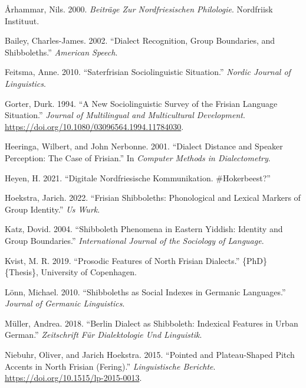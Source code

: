\documentclass[
  letterpaper,
  DIV=11,
  numbers=noendperiod]{scrartcl}
\newlength{\cslhangindent}
\newenvironment{CSLReferences}[2] %
 {\begin{list}{}{%
  \setlength{\itemindent}{0pt}
  \setlength{\leftmargin}{0pt}
  \setlength{\parsep}{0pt}
  \ifodd #1
   \setlength{\leftmargin}{\cslhangindent}
   \setlength{\itemindent}{-1\cslhangindent}
  \fi
  \setlength{\itemsep}{#2\baselineskip}}}
 {\end{list}}
\begin{document}
\label{refs}
\begin{CSLReferences}{1}{0}
Århammar, Nils. 2000. \emph{Beiträge Zur Nordfriesischen {Philologie}}.
Nordfriisk Instituut.

Bailey, Charles-James. 2002. {``Dialect {Recognition}, {Group}
{Boundaries}, and {Shibboleths}.''} \emph{American Speech}.

Feitsma, Anne. 2010. {``Saterfrisian Sociolinguistic Situation.''}
\emph{Nordic Journal of Linguistics}.

Gorter, Durk. 1994. {``A New Sociolinguistic Survey of the {Frisian}
Language Situation.''} \emph{Journal of Multilingual and Multicultural
Development}. \url{https://doi.org/10.1080/03096564.1994.11784030}.

Heeringa, Wilbert, and John Nerbonne. 2001. {``Dialect Distance and
Speaker Perception: {The} Case of {Frisian}.''} In \emph{Computer
{Methods} in {Dialectometry}}.

Heyen, H. 2021. {``Digitale Nordfriesische {Kommunikation}.
\#Hokerbeest?''}

Hoekstra, Jarich. 2022. {``Frisian {Shibboleths}: {Phonological} and
{Lexical} {Markers} of {Group} {Identity}.''} \emph{Us Wurk}.

Katz, Dovid. 2004. {``Shibboleth {Phenomena} in {Eastern} {Yiddish}:
{Identity} and {Group} {Boundaries}.''} \emph{International Journal of
the Sociology of Language}.

Kvist, M. R. 2019. {``Prosodic {Features} of {North} {Frisian}
{Dialects}.''} \{PhD\} \{Thesis\}, University of Copenhagen.

Lönn, Michael. 2010. {``Shibboleths as {Social} {Indexes} in {Germanic}
{Languages}.''} \emph{Journal of Germanic Linguistics}.

Müller, Andrea. 2018. {``Berlin {Dialect} as {Shibboleth}: {Indexical}
{Features} in {Urban} {German}.''} \emph{Zeitschrift Für Dialektologie
Und Linguistik}.

Niebuhr, Oliver, and Jarich Hoekstra. 2015. {``Pointed and
Plateau-Shaped Pitch Accents in {North} {Frisian} ({Fering}).''}
\emph{Linguistische Berichte}.
\url{https://doi.org/10.1515/lp-2015-0013}.


\end{CSLReferences}
\end{document}
